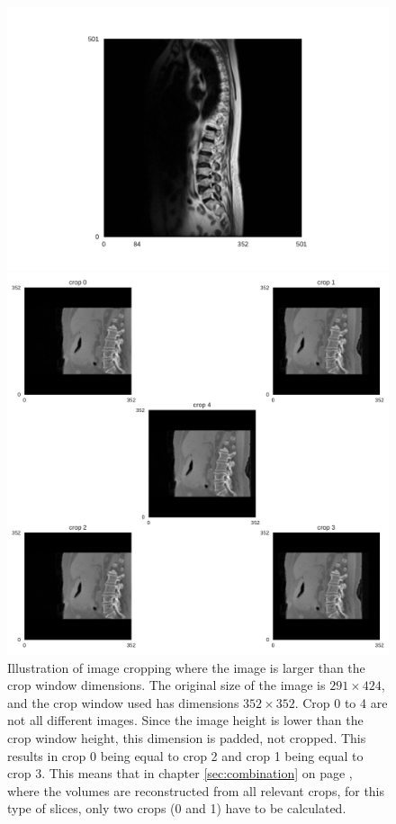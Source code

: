 \begin{figure}
    \centering
    \begin{minipage}{.99\textwidth}
        \includegraphics[width=.99\textwidth]{images/slice202.pdf}
    \end{minipage} 
    \begin{minipage}{0.99\textwidth}
        \includegraphics[width=.99\textwidth]{images/cropping_slice202.pdf}
    \end{minipage}
    \caption{
        Illustration of image cropping where the image is larger than the crop window dimensions.
        The original size of the image is $291 \times 424$, and the crop window used has dimensions $352 \times 352$.
        Crop 0 to 4 are not all different images. Since the image height is lower than the crop window height, this dimension is padded, not cropped.
        This results in crop 0 being equal to crop 2 and crop 1 being equal to crop 3. This means that in chapter \ref{sec:combination} on page \pageref{sec:combination}, 
        where the volumes are reconstructed from all relevant crops, for this type of slices, only two crops (0 and 1) have to be calculated.
        \label{fig:smallcrop}
        }
    
\end{figure}